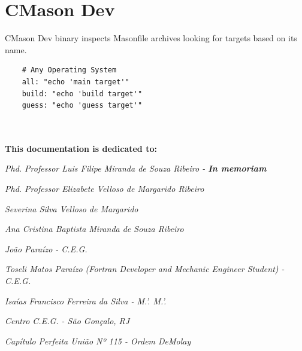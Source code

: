 \documentclass[]{article}
\begin{document}
\section{CMason Dev}
CMason Dev binary inspects Masonfile archives looking for targets based on its name.

\begin{verbatim}
	# Any Operating System
	all: "echo 'main target'"
	build: "echo 'build target'"
	guess: "echo 'guess target'"
	
	
\end{verbatim}


\textbf{This documentation is dedicated to:}



\emph{Phd. Professor Luis Filipe Miranda de Souza Ribeiro - \textbf{In memoriam}}

\emph{Phd. Professor Elizabete Velloso de Margarido Ribeiro}

\emph{Severina Silva Velloso de Margarido}

\emph{Ana Cristina Baptista Miranda de Souza Ribeiro}


\emph{João Paraízo - C.E.G.}

\emph{Toseli Matos Paraízo (Fortran Developer and Mechanic Engineer Student) - C.E.G.}

\emph{Isaías Francisco Ferreira da Silva - M.'. M.'.}


\emph{Centro C.E.G. - São Gonçalo, RJ}


\emph{Capítulo Perfeita União Nº 115 - Ordem DeMolay}
\end{document}

